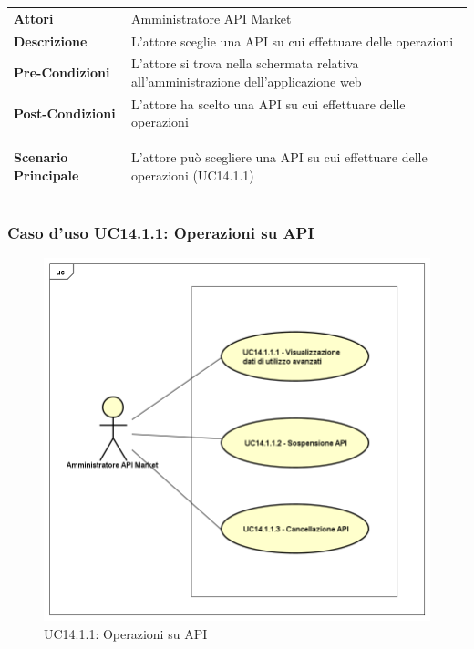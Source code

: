 \begin{minipage}{\linewidth}
	\begin{tabular}{ l | p{11cm}}
		\hline
		\rowcolor{Gray}
		\multicolumn{2}{c}{UC14.1 - Scelta API} \\
		\hline
		\textbf{Attori} & Amministratore API Market \\
		\textbf{Descrizione} & L'attore sceglie una API su cui effettuare delle operazioni \\
		\textbf{Pre-Condizioni} & L'attore si trova nella schermata relativa all'amministrazione dell'applicazione web \\
		\textbf{Post-Condizioni} & L'attore ha scelto una API su cui effettuare delle operazioni \\
		\textbf{Scenario Principale} & 
		\begin{enumerate*}[label=(\arabic*.),itemjoin={\newline}]
			\item L'attore può scegliere una API su cui effettuare delle operazioni (UC14.1.1)
		\end{enumerate*}\\
	\end{tabular}
\end{minipage}

\newpage
\subsubsection{Caso d'uso UC14.1.1: Operazioni su API}
\label{UC14_1_1}
\begin{figure}[ht]
	\centering
	\includegraphics[scale=0.45]{UML/UC14_1_1.png}
	\caption{UC14.1.1: Operazioni su API}
\end{figure}

